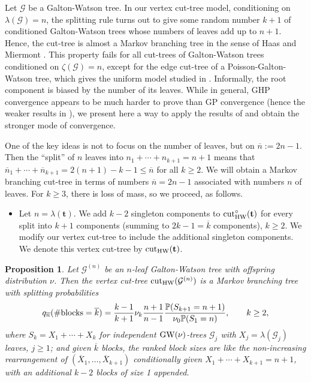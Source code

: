 \documentclass[11pt,a4paper]{article}
\newtheorem{prop}{Proposition}[section]
\newcommand{\bP}{\mathbb{P}}
\newcommand{\cG}{\mathcal{G}}
\newcommand{\ft}{\mathbf{t}}
\newcommand{\modcut}{{\rm cut}_{\rm HW}}
\newcommand{\ourcut}{{\rm cut}_{\rm HW}^\circ}
\begin{document}
Let $\cG$ be a Galton-Watson tree. In our vertex cut-tree model, conditioning on $\lambda(\cG)=n$, the splitting rule turns out to give some random number
$k+1$ of conditioned Galton-Watson trees whose numbers of leaves add up to $n+1$. Hence, the cut-tree is almost a Markov branching tree in the sense of Haas and
Miermont \cite{HM10}. This property fails for all cut-trees of Galton-Watson trees conditioned on $\zeta(\cG)=n$, except for the edge cut-tree of a Poisson-Galton-Watson
tree, which gives the uniform model studied in \cite{AP98,Bertoin2012,Pitman1999}. Informally, the root component is biased by the number of its 
leaves. While in general, GHP convergence appears to be much harder to prove than GP convergence (hence the weaker results in
\cite{BM,Die13}), we present here a way to apply the results of \cite{HM10} and obtain the stronger mode of convergence.

One of the key ideas is not to focus on the number of leaves, but on $\overline{n}:=2n-1$. Then the ``split'' of $n$ leaves into $n_1+\cdots+n_{k+1}=n+1$
means that $\overline{n}_1+\cdots+\overline{n}_{k+1}=2(n+1)-k-1\le\overline{n}$ for all $k\ge 2$. We will obtain a Markov branching
cut-tree in terms of numbers $\overline{n}=2n-1$ associated with numbers $n$ of leaves. For $k\ge 3$, there is loss of mass, so we proceed, as follows.%
\begin{itemize}\item Let $n=\lambda(\ft)$. We add $k-2$ singleton components to $\ourcut(\ft)$ for every split into $k+1$ components (summing to $2k-1=\overline{k}$ components), $k\ge 2$. We modify our
   vertex cut-tree to include the additional singleton components. We denote this vertex cut-tree by $\modcut(\ft)$.
\end{itemize}%

\begin{prop}\label{propspl} Let $\cG^{(n)}$ be an $n$-leaf Galton-Watson tree with offspring distribution $\nu$. Then the vertex cut-tree $\modcut(\cG^{(n)})$ is a Markov branching tree with splitting probabilities
  $$q_{\overline{n}}(\#{\rm blocks}=\overline{k})
		=\frac{k-1}{k+1}\nu_k\frac{n+1}{n-1}\frac{\bP(S_{k+1}=n+1)}{\nu_0\bP(S_1=n)},\qquad k\ge 2,$$
  where $S_k=X_1+\cdots+X_k$ for independent ${\rm GW}(\nu)$-trees $\cG_j$ with $X_j=\lambda(\cG_j)$ leaves, $j\ge 1$; and given $\overline{k}$ blocks, the
  ranked block sizes are like the non-increasing rearrangement of $(\overline{X}_1,\ldots,\overline{X}_{k+1})$
  conditionally given $X_1+\cdots+X_{k+1}=n+1$, with an additional $k-2$ blocks of size 1 appended.
\end{prop}
\end{document}
